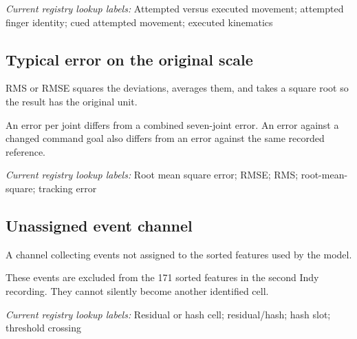 \noindent\textit{Current registry lookup labels:} Attempted versus executed movement; attempted finger identity; cued attempted movement; executed kinematics\par

\begin{samepage}
\subsection*{Typical error on the original scale}
\noindent RMS or RMSE squares the deviations, averages them, and takes a square root so the result has the original unit.\par
\end{samepage}
\begin{samepage}
\noindent An error per joint differs from a combined seven-joint error. An error against a changed command goal also differs from an error against the same recorded reference.\par\nopagebreak[4]

\end{samepage}


\noindent\textit{Current registry lookup labels:} Root mean square error; RMSE; RMS; root-mean-square; tracking error\par

\begin{samepage}
\subsection*{Unassigned event channel}
\noindent A channel collecting events not assigned to the sorted features used by the model.\par
\end{samepage}
\begin{samepage}
\noindent These events are excluded from the 171 sorted features in the second Indy recording. They cannot silently become another identified cell.\par\nopagebreak[4]

\end{samepage}


\noindent\textit{Current registry lookup labels:} Residual or hash cell; residual/hash; hash slot; threshold crossing\par

